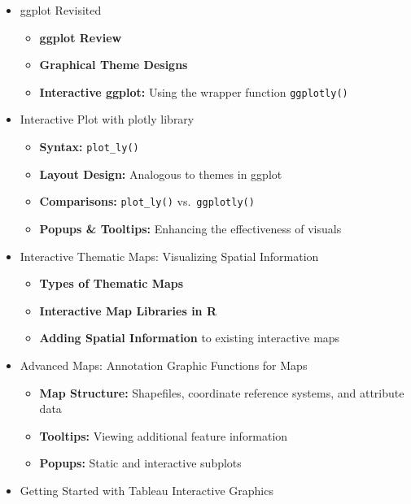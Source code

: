 \documentclass[
]{article}
\providecommand{\tightlist}{%
  \setlength{\itemsep}{0pt}\setlength{\parskip}{0pt}}
\begin{document}
\begin{itemize}
  \begin{itemize}
  \tightlist
  \item
    \textbf{Base R Functions} for data processing
  \item
    \textbf{Tidyverse Library}
  \item
    \textbf{Overview of Relational Databases} and basic SQL syntax
  \item
    \textbf{Table Structures:} Long and wide tables for different
    graphical comparisons
  \end{itemize}
\item
  ggplot Revisited

  \begin{itemize}
  \tightlist
  \item
    \textbf{ggplot Review}
  \item
    \textbf{Graphical Theme Designs}
  \item
    \textbf{Interactive ggplot:} Using the wrapper function
    \texttt{ggplotly()}
  \end{itemize}
\item
  Interactive Plot with plotly library

  \begin{itemize}
  \tightlist
  \item
    \textbf{Syntax:} \texttt{plot\_ly()}
  \item
    \textbf{Layout Design:} Analogous to themes in ggplot
  \item
    \textbf{Comparisons:} \texttt{plot\_ly()} vs.~\texttt{ggplotly()}
  \item
    \textbf{Popups \& Tooltips:} Enhancing the effectiveness of visuals
  \end{itemize}
\item
  Interactive Thematic Maps: Visualizing Spatial Information

  \begin{itemize}
  \tightlist
  \item
    \textbf{Types of Thematic Maps}
  \item
    \textbf{Interactive Map Libraries in R}
  \item
    \textbf{Adding Spatial Information} to existing interactive maps
  \end{itemize}
\item
  Advanced Maps: Annotation Graphic Functions for Maps

  \begin{itemize}
  \tightlist
  \item
    \textbf{Map Structure:} Shapefiles, coordinate reference systems,
    and attribute data
  \item
    \textbf{Tooltips:} Viewing additional feature information
  \item
    \textbf{Popups:} Static and interactive subplots
  \end{itemize}
\item
  Getting Started with Tableau Interactive Graphics


\end{itemize}
\end{document}
